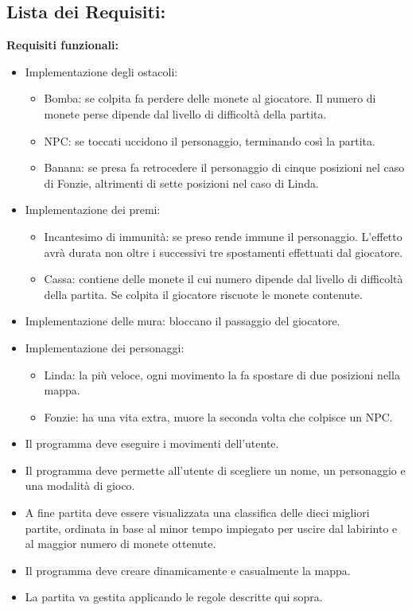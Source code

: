 \documentclass[12pt, letterpaper]{article}
\begin{document}
    \subsection{Lista dei Requisiti:}
        \textbf{Requisiti funzionali:}
            \begin{itemize}
                \item Implementazione degli ostacoli:
                \begin{itemize}
                    \item Bomba: se colpita fa perdere delle  monete al giocatore. Il numero di monete perse dipende dal livello di difficoltà della partita.
                    \item NPC: se toccati uccidono il personaggio, terminando così la partita.
                    \item Banana: se presa fa retrocedere il personaggio di cinque posizioni nel caso di Fonzie, altrimenti di sette posizioni nel caso di Linda.
                \end{itemize}
                \item Implementazione dei premi:
                \begin{itemize}
                    \item Incantesimo di immunità: se preso rende immune il personaggio. L'effetto avrà durata non oltre i successivi tre spostamenti effettuati dal giocatore.
                    \item Cassa: contiene delle monete il cui numero dipende dal livello di difficoltà della partita. Se colpita il giocatore riscuote le monete contenute.
                \end{itemize}
                \item Implementazione delle mura: bloccano il passaggio del giocatore.
                \item Implementazione dei personaggi:
                \begin{itemize}
                    \item Linda: la più veloce, ogni movimento la fa spostare di due posizioni nella mappa.
                    \item Fonzie: ha una vita extra, muore la seconda volta che colpisce un NPC.
                \end{itemize}
                \item Il programma deve eseguire i movimenti dell'utente. 
                \item Il programma deve permette all'utente di scegliere un nome, un personaggio e una modalità di gioco.
                \item A fine partita deve essere visualizzata una classifica delle dieci migliori partite, ordinata in base al minor tempo impiegato per uscire dal labirinto e al maggior numero di monete ottenute.
                \item Il programma deve creare dinamicamente e casualmente la mappa.
                \item La partita va gestita applicando le regole descritte qui sopra.
            \end{itemize}
\end{document}
